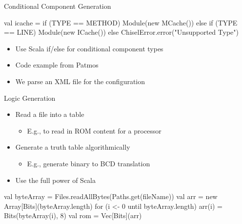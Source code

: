 \documentclass[xcolor=pdflatex,dvipsnames,table]{beamer}
\begin{document}
\begin{frame}[fragile]{Conditional Component Generation}
\begin{chisel}
val icache =
  if (TYPE == METHOD)
    Module(new MCache())
  else if (TYPE == LINE)
    Module(new ICache())
  else
    ChiselError.error("Unsupported Type")
\end{chisel}
\begin{itemize}
\item Use Scala if/else for conditional component types
\item Code example from Patmos
\item We parse an XML file for the configuration
\end{itemize}
\end{frame}

\begin{frame}[fragile]{Logic Generation}
\begin{itemize}
\item Read a file into a table
\begin{itemize}
\item E.g., to read in ROM content for a processor
\end{itemize}
\item Generate a truth table algorithmically
\begin{itemize}
\item E.g., generate binary to BCD translation
\end{itemize}
\item Use the full power of Scala
\end{itemize}
\begin{chisel}
val byteArray = Files.readAllBytes(Paths.get(fileName))
val arr = new Array[Bits](byteArray.length)
for (i <- 0 until byteArray.length) {
  arr(i) = Bits(byteArray(i), 8)
}
val rom = Vec[Bits](arr)
\end{chisel}
\end{frame}
%
\end{document}
